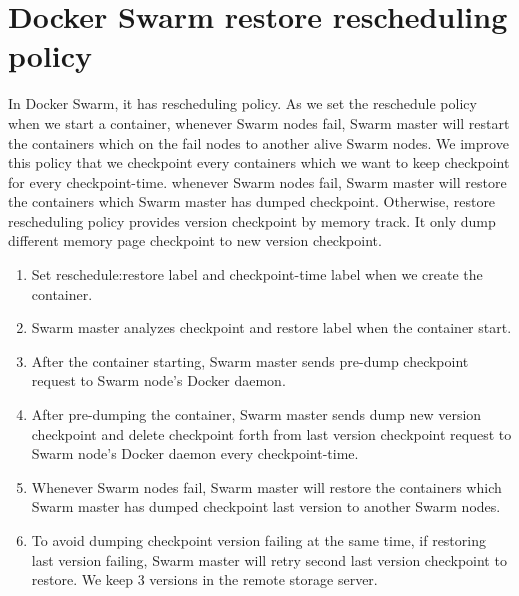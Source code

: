 \section{Docker Swarm restore rescheduling policy}
In Docker Swarm, it has rescheduling policy. As we set the reschedule policy when we start a container, whenever Swarm nodes fail, Swarm master will restart the containers which on the fail nodes to another alive Swarm nodes. We improve this policy that we checkpoint every containers which we want to keep checkpoint for every checkpoint-time. whenever Swarm nodes fail, Swarm master will restore the containers which Swarm master has dumped checkpoint. Otherwise, restore rescheduling policy provides version checkpoint by memory track. It only dump different memory page checkpoint to new version checkpoint.
\begin{enumerate}[Step 1.]
	\item Set reschedule:restore label and checkpoint-time label when we create the container.
    \item Swarm master analyzes checkpoint and restore label when the container start.
    \item After the container starting, Swarm master sends pre-dump checkpoint request to Swarm node's Docker daemon.
    \item After pre-dumping the container, Swarm master sends dump new version checkpoint and delete checkpoint forth from last version checkpoint request to Swarm node's Docker daemon every checkpoint-time.
    \item Whenever Swarm nodes fail, Swarm master will restore the containers which Swarm master has dumped checkpoint last version to another Swarm nodes.
    \item To avoid dumping checkpoint version failing at the same time, if restoring last version failing, Swarm master will retry second last version checkpoint to restore. We keep 3 versions in the remote storage server.
\end{enumerate}